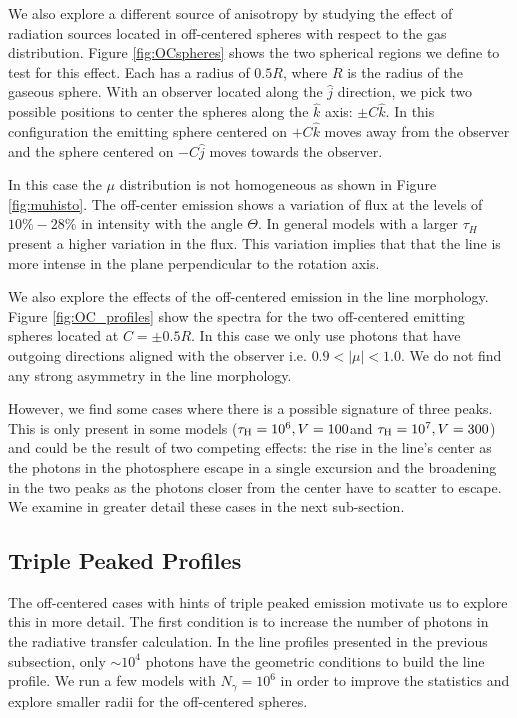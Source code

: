 \documentclass{emulateapj}
\newcommand{\kms}{{\ifmmode{{\mathrm{\,km\ s}^{-1}}}\else{\,km~s$^{-1}$}\fi}}
\begin{document}
We also explore a different source of anisotropy by studying the effect
of radiation sources located in off-centered spheres with respect to
the gas distribution. Figure \ref{fig:OCspheres} shows the two
spherical regions we define to test for this effect. Each has a radius
of $0.5R$, where $R$ is the radius of the gaseous sphere. With an
observer located along the $\hat{j}$ direction, we pick two possible
positions to center the spheres along the $\hat{k}$ axis: $\pm C\hat{k}$. In
this configuration the emitting sphere centered on $+C\hat{k}$ moves
away from the observer and the sphere centered on $-C\hat{j}$ moves
towards the observer. 


In this case the $\mu$ distribution is not homogeneous as shown in
Figure \ref{fig:muhisto}. The off-center emission shows a variation of flux at
the levels of $10\% - 28\%$ in intensity with the angle $\Theta$. In general 
models with a larger $\tau_{H}$ present a higher variation in the flux.
This variation implies that that the line is more intense in
the plane perpendicular to the rotation axis. 


We also explore the effects of the off-centered emission in the line
morphology. Figure \ref{fig:OC_profiles} show the spectra for the two
off-centered emitting spheres located at $C=\pm0.5R$.  In this case we
only use photons that have outgoing directions aligned with the
observer i.e. $0.9 <\vert \mu \vert < 1.0$. We do not find any strong
asymmetry in the line morphology.  


However, we find some cases where there is a possible signature of
three peaks. This is only present in some models ($\tau_{\rm H} = 10^6,
V=100$\kms and $\tau_{\rm H} = 10^7, V=300$\kms) and could be the result of
two competing effects: the rise in the line's center as the photons in
the photosphere escape in a single excursion and the broadening in the
two peaks as the photons closer from the center have to scatter to
escape. We examine in greater detail these cases in the next
sub-section. 



\subsection{Triple Peaked Profiles}
\label{sec:3p}

The off-centered cases with hints of triple peaked emission motivate us
to explore this in more detail. The first condition is to increase the
number of photons in the radiative transfer calculation. In the line
profiles presented in the previous subsection, only $\sim 10^4$ photons
have the geometric conditions to build the line profile. We run a few
models with $N_{\gamma} = 10^6$ in order to improve the statistics and
explore smaller radii for the off-centered spheres.
\end{document}
